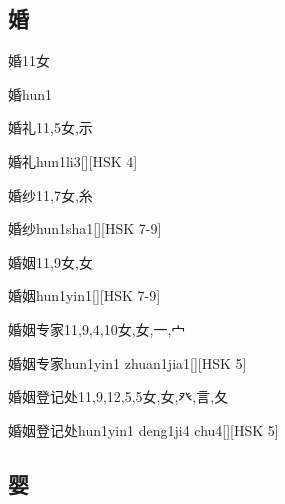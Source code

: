\subsection*{婚}

\begin{Entry}{婚}{11}{⼥}
  \begin{Phonetics}{婚}{hun1}
  \end{Phonetics}
\end{Entry}

\begin{Entry}{婚礼}{11,5}{⼥,⽰}
  \begin{Phonetics}{婚礼}{hun1li3}[][HSK 4]
  \end{Phonetics}
\end{Entry}

\begin{Entry}{婚纱}{11,7}{⼥,⽷}
  \begin{Phonetics}{婚纱}{hun1sha1}[][HSK 7-9]
  \end{Phonetics}
\end{Entry}

\begin{Entry}{婚姻}{11,9}{⼥,⼥}
  \begin{Phonetics}{婚姻}{hun1yin1}[][HSK 7-9]
  \end{Phonetics}
\end{Entry}

\begin{Entry}{婚姻专家}{11,9,4,10}{⼥,⼥,⼀,⼧}
  \begin{Phonetics}{婚姻专家}{hun1yin1 zhuan1jia1}[][HSK 5]
  \end{Phonetics}
\end{Entry}

\begin{Entry}{婚姻登记处}{11,9,12,5,5}{⼥,⼥,⽨,⾔,⼡}
  \begin{Phonetics}{婚姻登记处}{hun1yin1 deng1ji4 chu4}[][HSK 5]
  \end{Phonetics}
\end{Entry}

\subsection*{婴}

